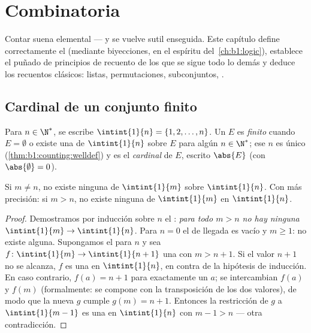 \chapter{Combinatoria}\label{ch:b1:counting}

Contar  suena elemental --- y se vuelve sutil enseguida.
Este capítulo define correctamente el  (mediante biyecciones, en el
espíritu del~\cref{ch:b1:logic}), establece el puñado de principios de
recuento de los que se sigue todo lo demás y deduce los recuentos
clásicos: listas, permutaciones, subconjuntos, .

\section{Cardinal de un conjunto finito}

\begin{definition}\label{def:b1:counting:card}
Para $n \in \N^*$, se escribe $\intint{1}{n} = \{1, 2, \dots,
n\}$. Un  $E$ es \emph{finito} cuando
$E = \emptyset$ o existe una  de $\intint{1}{n}$ sobre $E$
para algún $n \in \N^*$; ese $n$ es único (\cref{thm:b1:counting:welldef})
y es el \emph{cardinal} de $E$, escrito $\abs{E}$ (con
$\abs{\emptyset} = 0$).
\end{definition}

\begin{theorem}\label{thm:b1:counting:welldef}
Si $m \neq n$, no existe ninguna  de $\intint{1}{m}$ sobre
$\intint{1}{n}$. Con más precisión: si $m > n$, no existe ninguna
 de $\intint{1}{m}$ en $\intint{1}{n}$.
\end{theorem}

\begin{proof}
Demostramos por inducción sobre $n$ el : \emph{para todo $m > n$
no hay ninguna  $\intint{1}{m} \to \intint{1}{n}$}. Para
$n = 0$ el  de llegada es vacío y $m \geq 1$: no existe
 alguna. Supongamos el  para $n$ y sea $f \colon
\intint{1}{m} \to \intint{1}{n+1}$ una  con $m > n + 1$. Si el
valor $n + 1$ no se alcanza, $f$ es una  en $\intint{1}{n}$,
en contra de la hipótesis de inducción. En caso contrario,
$f(a) = n + 1$ para exactamente un $a$; se intercambian $f(a)$ y $f(m)$
(formalmente: se compone con la transposición de los dos valores), de
modo que la nueva  $g$ cumple $g(m) = n + 1$. Entonces la
restricción de $g$ a $\intint{1}{m-1}$ es una  en
$\intint{1}{n}$ con $m - 1 > n$ --- otra contradicción.
\end{proof}

